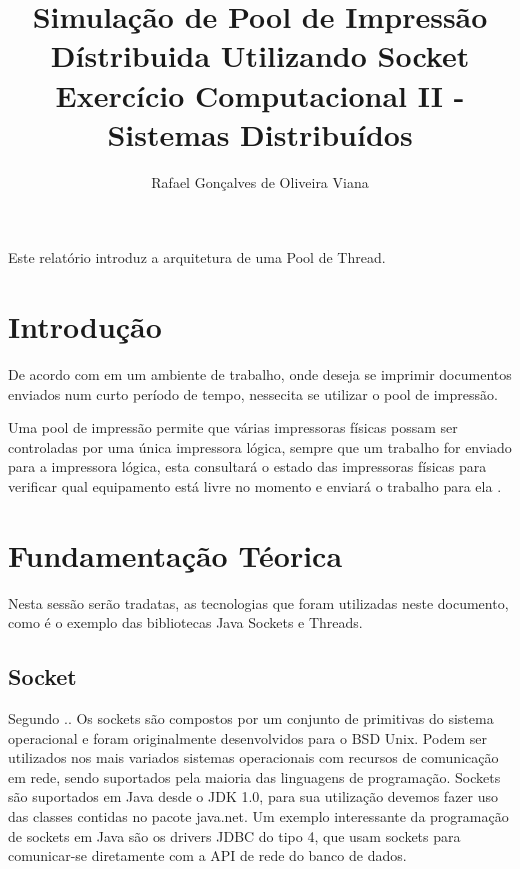 \documentclass[12pt]{article}
\title{ Simulação de Pool de Impressão Dístribuida Utilizando Socket \\ Exercício Computacional II - Sistemas Distribuídos}
\author{Rafael Gonçalves de Oliveira Viana\inst{1}  }
\begin{document}
 

\maketitle

     
\begin{resumo} 	
  Este relatório introduz a arquitetura de uma Pool de Thread.
\end{resumo}

\section{Introdução}
 De acordo com \cite{entf} em um ambiente de trabalho, onde deseja se imprimir documentos enviados num curto período de tempo, nessecita se  utilizar o pool de impressão.
 
 Uma pool de impressão permite que várias impressoras físicas possam ser controladas por uma única impressora lógica,  sempre que um trabalho for enviado para a impressora lógica, esta consultará o estado das impressoras físicas para verificar qual equipamento está livre no momento e enviará o trabalho para ela .
 
\section{Fundamentação Téorica} 
	Nesta sessão serão tradatas, as tecnologias que foram utilizadas neste documento, como é o exemplo das bibliotecas Java  Sockets e Threads.
 
\subsection{Socket}
 Segundo \cite{socket}.\cite{conc}.
 Os sockets são compostos por um conjunto de primitivas do sistema operacional e foram originalmente desenvolvidos para o BSD Unix. Podem ser utilizados nos mais variados sistemas operacionais com recursos de comunicação em rede, sendo suportados pela maioria das linguagens de programação. Sockets são suportados em Java desde o JDK 1.0, para sua utilização devemos fazer uso das classes contidas no pacote java.net. Um exemplo interessante da programação de sockets em Java são os drivers JDBC do tipo 4, que usam sockets para comunicar-se diretamente com a API de rede do banco de dados.
 
\end{document}
